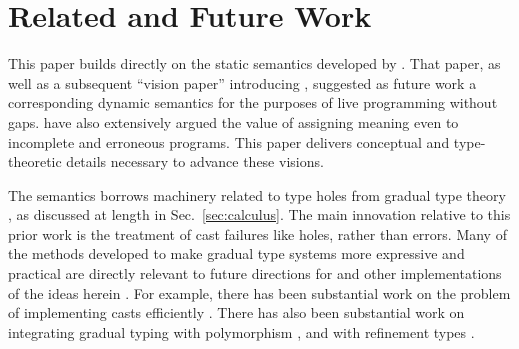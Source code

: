 \newcommand{\relatedWorkSection}{Related and Future Work}
\section{\relatedWorkSection} %
\label{sec:relatedWork}

This paper builds directly on the static semantics developed by \citet{popl-paper}. That paper, as well as a subsequent ``vision paper'' introducing \Hazel \cite{HazelnutSNAPL}, suggested as future work  
a corresponding dynamic semantics for the purposes of live programming without gaps. \citet{Bayne:2011:ASD:1985793.1985864} have also extensively argued the value of assigning meaning even to incomplete and erroneous programs. 
This paper delivers conceptual and type-theoretic details necessary to advance these visions.


The semantics borrows machinery related to type holes from gradual type theory \cite{Siek06a,DBLP:conf/snapl/SiekVCB15}, as discussed
at length in Sec.~\ref{sec:calculus}. The main innovation relative to this
prior work is the treatment of cast failures like holes, rather than errors.
Many of the methods developed to make gradual type systems more expressive and practical are directly relevant to future directions for \Hazel and other implementations of the ideas herein \cite{takikawa_et_al:LIPIcs:2015:5215}. For example, there has been substantial work on the problem of implementing casts efficiently \cite{herman2010space,siek2010threesomes,garcia2013threesomes}. There has also been substantial work on integrating gradual typing with polymorphism \cite{DBLP:conf/esop/XieBO18,DBLP:journals/pacmpl/DevriesePP18,Igarashi:2017:PGT:3136534.3110284}, and with refinement types \cite{DBLP:conf/popl/LehmannT17}.

